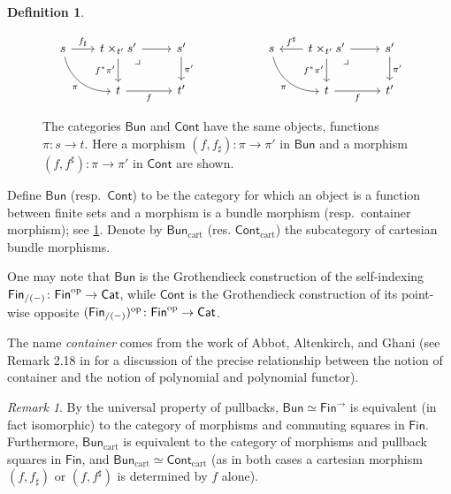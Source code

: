 \documentclass[11pt, article, one side]{memoir}
\theoremstyle{theorem}
\theoremstyle{definition}
\newtheorem{definition}[section]{Definition}
\theoremstyle{remark}
\newtheorem{remark}[section]{Remark}
\newcommand{\Cat}[1]{\mathsf{#1}}%
\newcommand{\op}{^\tn{op}}
\newcommand{\tn}[1]{\textnormal{#1}}
\newcommand{\smcat}{\Cat{Cat}}
\newcommand{\fin}{\Cat{Fin}}
\newcommand{\cont}{\Cat{Cont}}
\newcommand{\bun}{\Cat{Bun}}
\begin{document}
\begin{definition}
\begin{figure}
\[
  \begin{tikzcd}
  s\ar[dr, bend right=40pt, "\pi"']&[-5pt]
  t\times_{t'}s'\ar[r]\ar[d, "f^*\pi'"']\ar[from=l, "f_\sharp"]&
  s'\ar[d, "\pi'"]\\&
  t\ar[r, "f"']&
  t'\ar[ul, phantom, very near end, "\lrcorner"]
  \end{tikzcd}
  \hspace{.75in}
  \begin{tikzcd}
  s\ar[dr, bend right=40pt, "\pi"']&[-5pt]
  t\times_{t'}s'\ar[r]\ar[d, "f^*\pi'"']\ar[l, "f^\sharp"']&
  s'\ar[d, "\pi'"]\\&
  t\ar[r, "f"']&
  t'\ar[ul, phantom, very near end, "\lrcorner"]
  \end{tikzcd}
\]
\caption{The categories $\bun$ and $\cont$ have the same objects, functions $\pi\colon s\to t$. Here a morphism $(f,f_\sharp)\colon \pi\to \pi'$ in $\bun$ and a morphism $(f,f^\sharp)\colon \pi\to\pi'$ in $\cont$ are shown.
}
\label{fig.bund_cont_maps}
\end{figure}
Define $\bun$ (resp.\ $\cont$) to be the category for which an object is a function between finite sets and a morphism is a bundle morphism (resp.\ container morphism); see \cref{fig.bund_cont_maps}. Denote by $\bun_{\text{cart}}$ (res. $\cont_{\text{cart}}$) the subcategory of cartesian bundle morphisms.
\end{definition}

One may note that $\bun$ is the Grothendieck construction of the self-indexing $\fin_{/(-)} \colon \fin\op \to \smcat$, while $\cont$ is the Grothendieck construction of its point-wise opposite $(\fin_{/(-)})\op \colon \fin\op \to \smcat$.

 The name \emph{container} comes from the work of Abbot, Altenkirch, and Ghani \cites{AAG:Containers.In.Proceedings}{AAG:Containers}{A:Containers.Thesis} (see Remark 2.18 in \cite{GK:Polynomial.Functors} for a discussion of the precise relationship between the notion of container and the notion of polynomial and polynomial functor).

\begin{remark}\label{rem.dir_fin2}
By the universal property of pullbacks, $\bun\simeq\fin^{\to}$ is equivalent (in fact isomorphic) to the category of morphisms and commuting squares in $\fin$. Furthermore, $\bun_{\text{cart}}$ is equivalent to the category of morphisms and pullback squares in $\fin$, and $\bun_{\text{cart}} \simeq \cont_{\text{cart}}$ (as in both cases a cartesian morphism $(f, f_{\sharp})$ or $(f, f^{\sharp})$ is determined by $f$ alone).
\end{remark}
\end{document}
